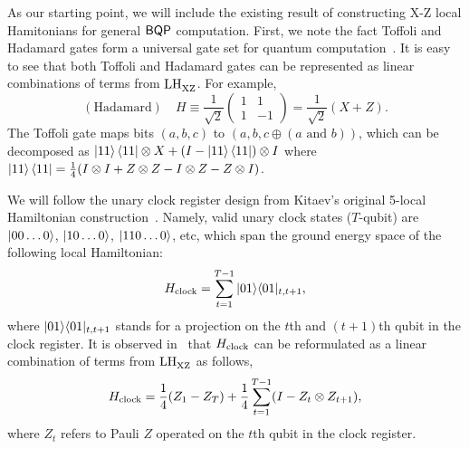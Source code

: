 As our starting point, we will include the existing result of constructing X-Z local Hamitonians for general $\operatorname{\mathsf{BQP}}$ computation. 
First, we note the fact Toffoli and Hadamard gates form a universal gate set for quantum computation~\cite{Shi03, quant-ph/0301040}. 
It is easy to see that both Toffoli and Hadamard gates can be represented as linear combinations of terms from $\mathrm{LH}_{\mathrm{XZ}}^{}$. For example, 
 \begin{equation}
     \mathrm{(Hadamard)} \quad H \equiv \frac{1}{\sqrt{2}} \begin{pmatrix}1&1\\1&-1\end{pmatrix} = \frac{1}{\sqrt{2}}\left (X+Z\right).
 \end{equation}
 The Toffoli gate maps bits $(a,b,c)$ to $(a,b, c \oplus (a \text{ and } b))$, which can be decomposed as $\ket{11}\bra{11}\otimes X+(I-\ket{11}\bra{11})\otimes I$ where $\ket{11}\bra{11}=\frac{1}{4}(I\otimes I+Z\otimes Z-I\otimes Z-Z\otimes I)$.

We will follow the unary clock register design from Kitaev's original 5-local Hamiltonian construction~\cite{kitaev2002classical}. Namely, valid unary clock states ($T$-qubit) are $\ket{00\ldots0}$, $\ket{10\dots0}$, $\ket{110\ldots0}$, etc, which span the ground energy space of the following local Hamiltonian: 
\begin{equation}
    H_{\mathrm{clock}}= \sum_{t=1}^{T-1}|01\rangle\langle 01|_{t,t+1},
\end{equation}
where $|01\rangle\langle 01|_{t,t+1}$ stands for a projection on the $t$th and $(t+1)$th qubit in the clock register. 
It is observed in~\cite{PhysRevA.78.012352} that $H_{\mathrm{clock}}$ can be reformulated as a linear combination of terms from $\mathrm{LH}_{\mathrm{XZ}}^{}$ as follows, 
\begin{equation} \label{eqn:Hclock}
   H_{\mathrm{clock}}= \frac{1}{4}(Z_1 - Z_T) + \frac{1}{4}\sum_{t=1}^{T-1}(I-Z_t\otimes Z_{t+1}),
\end{equation}
where $Z_t$ refers to Pauli $Z$ operated on the $t$th qubit in the clock register. 

